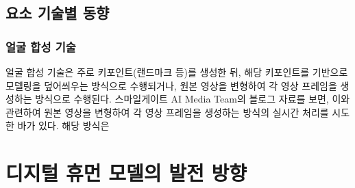 \documentclass[
	10pt,
	a4paper,
	figtabcapt,
]{oblivoir}
\begin{document}
\subsection{요소 기술별 동향}
\subsubsection{얼굴 합성 기술}
얼굴 합성 기술은 주로 키포인트(랜드마크 등)를 생성한 뒤,
해당 키포인트를 기반으로 모델링을 덮어씌우는 방식으로 수행\cite{MeshTalk2021}되거나,
원본 영상을 변형하여 각 영상 프레임을 생성하는 방식\cite{MakeItTalk2020}으로 수행된다.
스마일게이트 AI Media Team의 블로그 자료를 보면,
이와 관련하여 원본 영상을 변형하여 각 영상 프레임을 생성하는 방식의 실시간 처리를 시도한 바가 있다.
해당 방식은

\section{디지털 휴먼 모델의 발전 방향}

 


\clearpage
\end{document}
